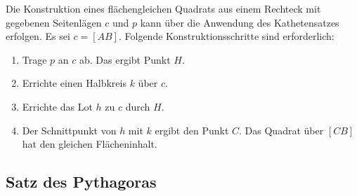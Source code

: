 \begin{beme}
 Die Konstruktion eines flächengleichen Quadrats aus einem Rechteck mit gegebenen Seitenlägen \(c\) und \(p\) kann über die Anwendung des Kathetensatzes erfolgen. Es sei \(c=[AB]\). Folgende Konstruktionsschritte sind erforderlich:
 \begin{enumerate}
  \item Trage \(p\) an \(c\) ab. Das ergibt Punkt \(H\).
  \item Errichte einen Halbkreis \(k\) über \(c\).
  \item Errichte das Lot \(h\) zu \(c\) durch \(H\).
  \item Der Schnittpunkt von \(h\) mit \(k\) ergibt den Punkt \(C\). Das Quadrat über \([CB]\) hat den gleichen Flächeninhalt.
 \end{enumerate}
\end{beme}


\subsection{Satz des Pythagoras}

